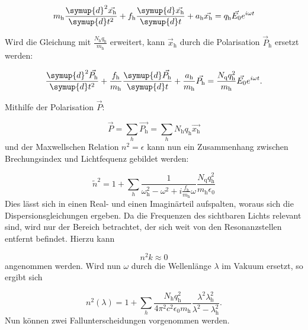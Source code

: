 \begin{equation}
m_{\text{h}} \frac{\symup{d}^2\vec{x_{\text{h}}}}{\symup{d}t^2} + f_{\text{h}}\frac{\symup{d}\vec{x_{\text{h}}}}{\symup{d}t} + a_{\text{h}}\vec{x_{\text{h}}} = q_{\text{h}} \vec{E_0} e^{i \omega t}
\end{equation}

Wird die Gleichung mit $\frac{N_{\text{h}} q_{\text{h}}}{m_{\text{h}}}$ erweitert, kann $\vec{x}_{\text{h}}$ durch die Polarisation $\vec{P}_{\text{h}}$ ersetzt werden:

\begin{equation}
\frac{\symup{d}^2\vec{P_{\text{h}}}}{\symup{d}t^2} + \frac{f_{\text{h}}}{m_{\text{h}}}\frac{\symup{d}\vec{P_{\text{h}}}}{\symup{d}t} + \frac{a_{\text{h}}}{m_{\text{h}}}\vec{P_{\text{h}}} = \frac{N_{\text{q}} q_{\text{h}}^2}{m_{\text{h}}} \vec{E_0} e^{i \omega t}.
\end{equation}

Mithilfe der Polarisation $\vec{P}$:

\begin{equation}
\vec{P} = \sum_h \vec{P_{\text{h}}} = \sum_h N_{\text{h}} q_{\text{h}} \vec{x_{\text{h}}}
\end{equation}
und der Maxwellschen Relation $n^2 = \epsilon$  kann nun ein Zusammenhang zwischen Brechungsindex und Lichtfequenz gebildet werden:

\begin{equation}
\tilde{n}^2 = 1 + \sum_h \frac{1}{\omega_{\text{h}}^2 - \omega^2 + i \frac{f_{\text{h}}}{m_{\text{h}}} \omega} \frac{N_{\text{q}} q_{\text{h}}^2}{m_{\text{h}} \epsilon_0}
\end{equation}
Dies lässt sich in einen Real- und einen Imaginärteil aufspalten, woraus sich die Dispersionsgleichungen ergeben. Da die Frequenzen des sichtbaren Lichts relevant sind, wird nur der Bereich betrachtet, der sich weit von den Resonanzstellen entfernt befindet. Hierzu kann 

\begin{equation*}
n^2k \approx 0
\end{equation*}
angenommen werden. Wird nun $\omega$ durch die Wellenlänge $\lambda$ im Vakuum ersetzt, so ergibt sich

\begin{equation}
n^2(\lambda) = 1 + \sum_h \frac{N_{\text{h}} q_{\text{h}}^2}{4\pi^2 c^2 \epsilon_0 m_{\text{h}}} \frac{\lambda^2 \lambda_{\text{h}}^2}{\lambda^2 - \lambda_{\text{h}}^2}.
\label{eq:nquadrat}
\end{equation}
Nun können zwei Fallunterscheidungen vorgenommen werden.


